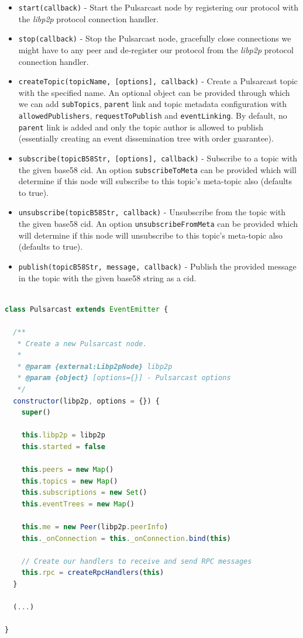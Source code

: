 \begin{itemize}
  \item
    \verb|start(callback)| -  Start the Pulsarcast node by registering our protocol with the \emph{libp2p} protocol connection handler.
  \item
    \verb|stop(callback)| - Stop the Pulsarcast node, gracefully close connections we might have to any peer and de-register our protocol from the \emph{libp2p} protocol connection handler.
  \item
  \verb|createTopic(topicName, [options], callback)| - Create a Pulsarcast topic with the specified name. An optional object can be provided through which we can add \verb|subTopics|, \verb|parent| link and topic metadata configuration with \verb|allowedPublishers|, \verb|requestToPublish| and \verb|eventLinking|. By default, no \verb|parent| link is added and only the topic author is allowed to publish (essentially creating an event dissemination tree with order guarantee).
  \item
    \verb|subscribe(topicB58Str, [options], callback)| - Subscribe to a topic with the given base58 \acrshort{cid}. An option \verb|subscribeToMeta| can be provided which will determine if this node will subscribe to this topic's meta-topic also (defaults to true).
  \item
    \verb|unsubscribe(topicB58Str, callback)| - Unsubscribe from the topic with the given base58 \acrshort{cid}. An option \verb|unsubscribeFromMeta| can be provided which will determine if this node will unsubscribe to this topic's meta-topic also (defaults to true).
  \item
    \verb|publish(topicB58Str, message, callback)| - Publish the provided message in the topic with the given base58 string as a \acrshort{cid}.
\end{itemize}

\begin{lstlisting}[language=JavaScript, float, caption={Pulsarcast constructor},label={pulsarcast-constructor}]

class Pulsarcast extends EventEmitter {

  /**
   * Create a new Pulsarcast node.
   *
   * @param {external:Libp2pNode} libp2p
   * @param {object} [options={}] - Pulsarcast options
   */
  constructor(libp2p, options = {}) {
    super()

    this.libp2p = libp2p
    this.started = false

    this.peers = new Map()
    this.topics = new Map()
    this.subscriptions = new Set()
    this.eventTrees = new Map()

    this.me = new Peer(libp2p.peerInfo)
    this._onConnection = this._onConnection.bind(this)

    // Create our handlers to receive and send RPC messages
    this.rpc = createRpcHandlers(this)
  }

  (...)

}
\end{lstlisting}

